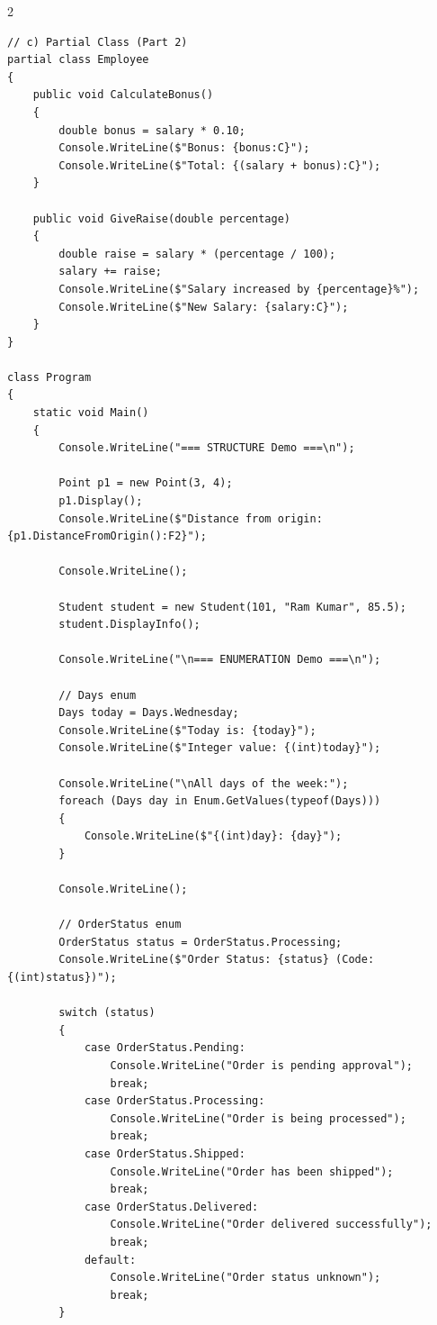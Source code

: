\documentclass[10pt,a4paper]{article}
\begin{document}
\begin{multicols}{2}
\begin{lstlisting}
// c) Partial Class (Part 2)
partial class Employee
{
    public void CalculateBonus()
    {
        double bonus = salary * 0.10;
        Console.WriteLine($"Bonus: {bonus:C}");
        Console.WriteLine($"Total: {(salary + bonus):C}");
    }
    
    public void GiveRaise(double percentage)
    {
        double raise = salary * (percentage / 100);
        salary += raise;
        Console.WriteLine($"Salary increased by {percentage}%");
        Console.WriteLine($"New Salary: {salary:C}");
    }
}

class Program
{
    static void Main()
    {
        Console.WriteLine("=== STRUCTURE Demo ===\n");
        
        Point p1 = new Point(3, 4);
        p1.Display();
        Console.WriteLine($"Distance from origin: {p1.DistanceFromOrigin():F2}");
        
        Console.WriteLine();
        
        Student student = new Student(101, "Ram Kumar", 85.5);
        student.DisplayInfo();
        
        Console.WriteLine("\n=== ENUMERATION Demo ===\n");
        
        // Days enum
        Days today = Days.Wednesday;
        Console.WriteLine($"Today is: {today}");
        Console.WriteLine($"Integer value: {(int)today}");
        
        Console.WriteLine("\nAll days of the week:");
        foreach (Days day in Enum.GetValues(typeof(Days)))
        {
            Console.WriteLine($"{(int)day}: {day}");
        }
        
        Console.WriteLine();
        
        // OrderStatus enum
        OrderStatus status = OrderStatus.Processing;
        Console.WriteLine($"Order Status: {status} (Code: {(int)status})");
        
        switch (status)
        {
            case OrderStatus.Pending:
                Console.WriteLine("Order is pending approval");
                break;
            case OrderStatus.Processing:
                Console.WriteLine("Order is being processed");
                break;
            case OrderStatus.Shipped:
                Console.WriteLine("Order has been shipped");
                break;
            case OrderStatus.Delivered:
                Console.WriteLine("Order delivered successfully");
                break;
            default:
                Console.WriteLine("Order status unknown");
                break;
        }
        

\end{lstlisting}
\end{multicols}
\end{document}
